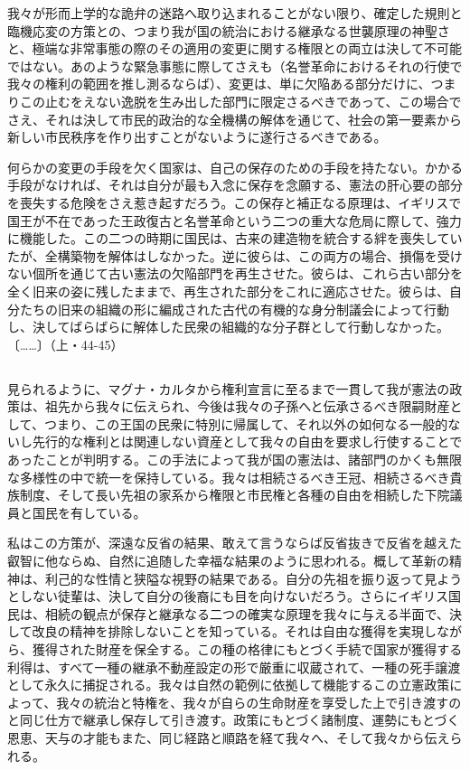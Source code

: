 我々が形而上学的な詭弁の迷路へ取り込まれることがない限り、確定した規則と臨機応変の方策との、つまり我が国の統治における継承なる世襲原理の神聖さと、極端な非常事態の際のその適用の変更に関する権限との両立は決して不可能ではない。あのような緊急事態に際してさえも（名誉革命におけるそれの行使で我々の権利の範囲を推し測るならば）、変更は、単に欠陥ある部分だけに、つまりこの止むをえない逸脱を生み出した部門に限定さるべきであって、この場合でさえ、それは決して市民的政治的な全機構の解体を通じて、社会の第一要素から新しい市民秩序を作り出すことがないように遂行さるべきである。

何らかの変更の手段を欠く国家は、自己の保存のための手段を持たない。かかる手段がなければ、それは自分が最も入念に保存を念願する、憲法の肝心要の部分を喪失する危険をさえ惹き起すだろう。この保存と補正なる原理は、イギリスで国王が不在であった王政復古と名誉革命という二つの重大な危局に際して、強力に機能した。この二つの時期に国民は、古来の建造物を統合する絆を喪失していたが、全構築物を解体はしなかった。逆に彼らは、この両方の場合、損傷を受けない個所を通じて古い憲法の欠陥部門を再生させた。彼らは、これら古い部分を全く旧来の姿に残したままで、再生された部分をこれに適応させた。彼らは、自分たちの旧来の組織の形に編成された古代の有機的な身分制議会によって行動し、決してばらばらに解体した民衆の組織的な分子群として行動しなかった。〔……〕（上・44-45）

\subsection{}




見られるように、マグナ・カルタから権利宣言に至るまで一貫して我が憲法の政策は、祖先から我々に伝えられ、今後は我々の子孫へと伝承さるべき限嗣財産として、つまり、この王国の民衆に特別に帰属して、それ以外の如何なる一般的ないし先行的な権利とは関連しない資産として我々の自由を要求し行使することであったことが判明する。この手法によって我が国の憲法は、諸部門のかくも無限な多様性の中で統一を保持している。我々は相続さるべき王冠、相続さるべき貴族制度、そして長い先祖の家系から権限と市民権と各種の自由を相続した下院議員と国民を有している。

私はこの方策が、深遠な反省の結果、敢えて言うならば反省抜きで反省を越えた叡智に他ならぬ、自然に追随した幸福な結果のように思われる。概して革新の精神は、利己的な性情と狭隘な視野の結果である。自分の先祖を振り返って見ようとしない徒輩は、決して自分の後裔にも目を向けないだろう。さらにイギリス国民は、相続の観点が保存と継承なる二つの確実な原理を我々に与える半面で、決して改良の精神を排除しないことを知っている。それは自由な獲得を実現しながら、獲得された財産を保全する。この種の格律にもとづく手続で国家が獲得する利得は、すべて一種の継承不動産設定の形で厳重に収蔵されて、一種の死手譲渡として永久に捕捉される。我々は自然の範例に依拠して機能するこの立憲政策によって、我々の統治と特権を、我々が自らの生命財産を享受した上で引き渡すのと同じ仕方で継承し保存して引き渡す。政策にもとづく諸制度、運勢にもとづく恩恵、天与の才能もまた、同じ経路と順路を経て我々へ、そして我々から伝えられる。

